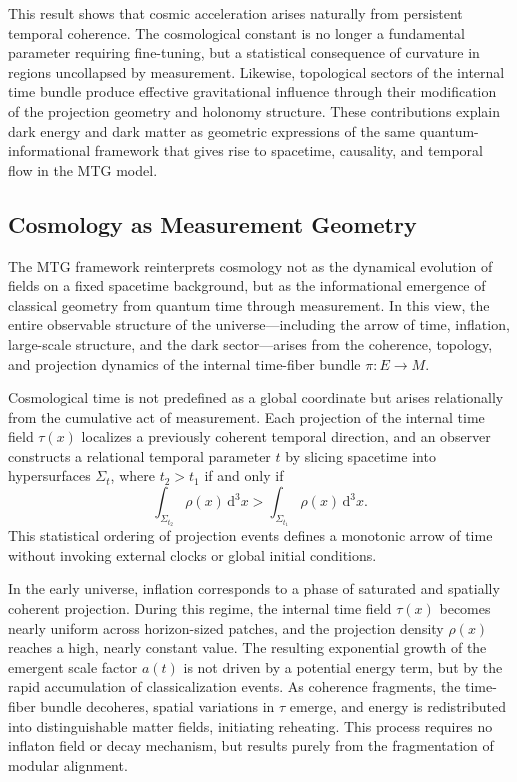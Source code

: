 \documentclass[11pt]{article}
\begin{document}
This result shows that cosmic acceleration arises naturally from persistent temporal coherence. The cosmological constant is no longer a fundamental parameter requiring fine-tuning, but a statistical consequence of curvature in regions uncollapsed by measurement. Likewise, topological sectors of the internal time bundle produce effective gravitational influence through their modification of the projection geometry and holonomy structure. These contributions explain dark energy and dark matter as geometric expressions of the same quantum-informational framework that gives rise to spacetime, causality, and temporal flow in the MTG model.
\subsection{Cosmology as Measurement Geometry}

The MTG framework reinterprets cosmology not as the dynamical evolution of fields on a fixed spacetime background, but as the informational emergence of classical geometry from quantum time through measurement. In this view, the entire observable structure of the universe---including the arrow of time, inflation, large-scale structure, and the dark sector---arises from the coherence, topology, and projection dynamics of the internal time-fiber bundle \( \pi: E \to M \).

Cosmological time is not predefined as a global coordinate but arises relationally from the cumulative act of measurement. Each projection of the internal time field \( \tau(x) \) localizes a previously coherent temporal direction, and an observer constructs a relational temporal parameter \( t \) by slicing spacetime into hypersurfaces \( \Sigma_t \), where \( t_2 > t_1 \) if and only if
\[
\int_{\Sigma_{t_2}} \rho(x) \, \mathrm{d}^3x > \int_{\Sigma_{t_1}} \rho(x) \, \mathrm{d}^3x.
\]
This statistical ordering of projection events defines a monotonic arrow of time without invoking external clocks or global initial conditions.

In the early universe, inflation corresponds to a phase of saturated and spatially coherent projection. During this regime, the internal time field \( \tau(x) \) becomes nearly uniform across horizon-sized patches, and the projection density \( \rho(x) \) reaches a high, nearly constant value. The resulting exponential growth of the emergent scale factor \( a(t) \) is not driven by a potential energy term, but by the rapid accumulation of classicalization events. As coherence fragments, the time-fiber bundle decoheres, spatial variations in \( \tau \) emerge, and energy is redistributed into distinguishable matter fields, initiating reheating. This process requires no inflaton field or decay mechanism, but results purely from the fragmentation of modular alignment.
\end{document}
